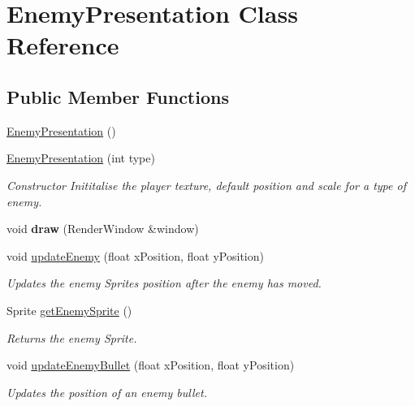 \hypertarget{class_enemy_presentation}{}\section{Enemy\+Presentation Class Reference}
\label{class_enemy_presentation}
\subsection*{Public Member Functions}
\begin{DoxyCompactItemize}
\item 
\hyperlink{class_enemy_presentation_aa17b851454a7bc3a86a6c20e803f5e76}{Enemy\+Presentation} ()
\item 
\hyperlink{class_enemy_presentation_a78e7f250c31e2e6d6327ead1ef12f4c8}{Enemy\+Presentation} (int type)
\begin{DoxyCompactList}\small\item\em Constructor Inititalise the player texture, default position and scale for a type of enemy. \end{DoxyCompactList}\item 
\mbox{\label{class_enemy_presentation_a9af0b870bea65e9fa170f6eb20394265}} 
void {\bfseries draw} (Render\+Window \&window)
\item 
void \hyperlink{class_enemy_presentation_adc38a8f56b24ec4aea9157dd74884b40}{update\+Enemy} (float x\+Position, float y\+Position)
\begin{DoxyCompactList}\small\item\em Updates the enemy Sprite\textquotesingle{}s position after the enemy has moved. \end{DoxyCompactList}\item 
Sprite \hyperlink{class_enemy_presentation_a9b88f3f215f5f94028f732005c68daa9}{get\+Enemy\+Sprite} ()
\begin{DoxyCompactList}\small\item\em Returns the enemy Sprite. \end{DoxyCompactList}\item 
void \hyperlink{class_enemy_presentation_ad7d1f196be857ea51b2ced17b5199b40}{update\+Enemy\+Bullet} (float x\+Position, float y\+Position)
\begin{DoxyCompactList}\small\item\em Updates the position of an enemy bullet. \end{DoxyCompactList}\item 

\end{DoxyCompactItemize}
